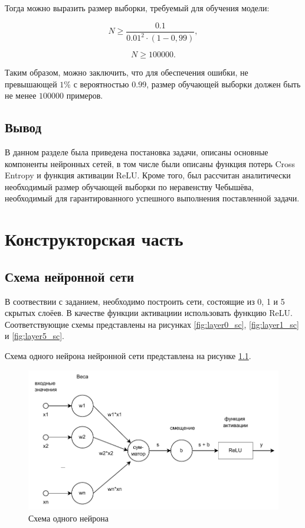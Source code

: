 \documentclass[12pt]{report}
\begin{document}
Тогда можно выразить размер выборки, требуемый для обучения модели:

\begin{equation}
	\label{hash}
	N \ge \frac{0.1}{0.01^2 \cdot (1 - 0,99)},
\end{equation}


\begin{equation}
	\label{hash}
	N \ge 100000.
\end{equation}

Таким образом, можно заключить, что для обеспечения ошибки, не превышающей $1$\% с вероятностью $0.99$, размер обучающей выборки должен быть не менее $100000$ примеров.



\section*{Вывод}
В данном разделе была приведена постановка задачи, описаны основные компоненты нейронных сетей, в том числе были описаны функция потерь Cross Entropy и функция активации ReLU. Кроме того, был рассчитан аналитически необходимый размер обучающей выборки по неравенству Чебышёва, необходимый для гарантированного успешного выполнения поставленной задачи.

\clearpage

\chapter{Конструкторская часть}
\section{Схема нейронной сети}
В соотвествии с заданием, необходимо построить сети, состоящие из 0, 1 и 5 скрытых слоёев. В качестве функции активациии использовать функцию ReLU. Соответствующие схемы представлены на рисунках \ref{fig:layer0_sc}, \ref{fig:layer1_sc} и \ref{fig:layer5_sc}.

Схема одного нейрона нейронной сети представлена на рисунке \ref{fig:neyron}.

\begin{figure}[h!]
  \centering
  \includegraphics[width = \linewidth]{neyron.pdf}
  \caption{Схема одного нейрона}
  \label{fig:neyron}
\end{figure}
\end{document}
